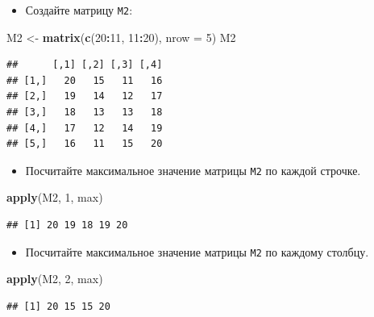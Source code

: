 \documentclass[]{book}
\newenvironment{Shaded}{\begin{snugshade}}{\end{snugshade}}
\newcommand{\KeywordTok}[1]{\textcolor[rgb]{0.13,0.29,0.53}{\textbf{#1}}}
\newcommand{\DataTypeTok}[1]{\textcolor[rgb]{0.13,0.29,0.53}{#1}}
\newcommand{\DecValTok}[1]{\textcolor[rgb]{0.00,0.00,0.81}{#1}}
\newcommand{\StringTok}[1]{\textcolor[rgb]{0.31,0.60,0.02}{#1}}
\newcommand{\OperatorTok}[1]{\textcolor[rgb]{0.81,0.36,0.00}{\textbf{#1}}}
\newcommand{\NormalTok}[1]{#1}
\providecommand{\tightlist}{%
  \setlength{\itemsep}{0pt}\setlength{\parskip}{0pt}}
\begin{document}
\begin{itemize}
\tightlist
\item
  Создайте матрицу \texttt{M2}:
\end{itemize}

\begin{Shaded}
\begin{Highlighting}[]
\NormalTok{M2 <-}\StringTok{ }\KeywordTok{matrix}\NormalTok{(}\KeywordTok{c}\NormalTok{(}\DecValTok{20}\OperatorTok{:}\DecValTok{11}\NormalTok{, }\DecValTok{11}\OperatorTok{:}\DecValTok{20}\NormalTok{), }\DataTypeTok{nrow =} \DecValTok{5}\NormalTok{)}
\NormalTok{M2}
\end{Highlighting}
\end{Shaded}

\begin{verbatim}
##      [,1] [,2] [,3] [,4]
## [1,]   20   15   11   16
## [2,]   19   14   12   17
## [3,]   18   13   13   18
## [4,]   17   12   14   19
## [5,]   16   11   15   20
\end{verbatim}

\begin{itemize}
\tightlist
\item
  Посчитайте максимальное значение матрицы \texttt{M2} по каждой
  строчке.
\end{itemize}

\begin{Shaded}
\begin{Highlighting}[]
\KeywordTok{apply}\NormalTok{(M2, }\DecValTok{1}\NormalTok{, max)}
\end{Highlighting}
\end{Shaded}

\begin{verbatim}
## [1] 20 19 18 19 20
\end{verbatim}

\begin{itemize}
\tightlist
\item
  Посчитайте максимальное значение матрицы \texttt{M2} по каждому
  столбцу.
\end{itemize}

\begin{Shaded}
\begin{Highlighting}[]
\KeywordTok{apply}\NormalTok{(M2, }\DecValTok{2}\NormalTok{, max)}
\end{Highlighting}
\end{Shaded}

\begin{verbatim}
## [1] 20 15 15 20
\end{verbatim}
\end{document}
